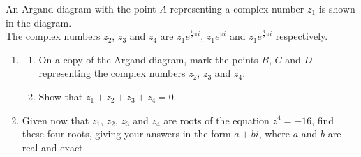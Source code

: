 \documentclass[leqno]{article}
\begin{document}
\djsFrontMatter
\begin{enumerate}[
  label=\textbf{\arabic*.},
  leftmargin=*,
  topsep=0pt,
  partopsep=0pt,
  parsep=0pt
]

\questionitem

\begin{figure}[H]
    \centering
{}
\end{figure}


An Argand diagram with the point $A$ representing a complex number $z_1$ is shown in the diagram. \\
The complex numbers $z_2$, $z_3$ and $z_4$ are $z_1e^{\frac{1}{2}\pi i}$, $z_1e^{\pi i}$ and $z_1e^{\frac{3}{2}\pi i}$ respectively. \\
\begin{enumerate}[label=\textbf{(\alph*)}]
  \item
  \begin{enumerate}[label=(\roman*)]
    \item On a copy of the Argand diagram, mark the points $B$, $C$ and $D$ representing the complex numbers $z_2$, $z_3$ and $z_4$. 
    \item Show that $z_1+z_2+z_3+z_4=0$.  \\
  \end{enumerate}
  \item Given now that $z_1$, $z_2$, $z_3$ and $z_4$ are roots of the equation $z^4=-16$, find these four roots, giving your answers in the form $a+bi$, where $a$ and $b$ are real and exact.  \\
\end{enumerate}

\newpage

\questionitem


\end{enumerate}
\end{document}
